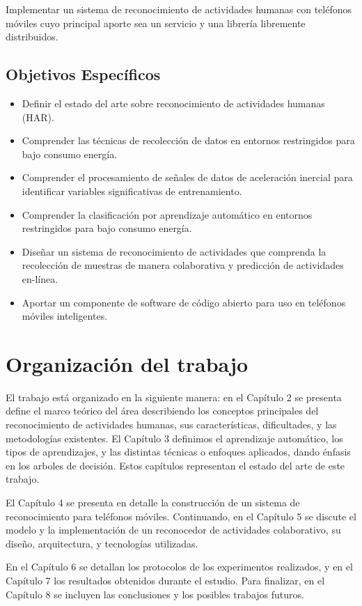 \label{objetivo-general}

Implementar un sistema de reconocimiento de actividades humanas con
teléfonos móviles cuyo principal aporte sea un servicio y una librería
libremente distribuidos.

\subsection{Objetivos Específicos}

\label{objetivos-especuxedficos}
\begin{itemize}
\item Definir el estado del arte sobre reconocimiento de actividades humanas
(HAR). 
\item Comprender las técnicas de recolección de datos en entornos restringidos
para bajo consumo energía. 
\item Comprender el procesamiento de señales de datos de aceleración inercial
para identificar variables significativas de entrenamiento. 
\item Comprender la clasificación por aprendizaje automático en entornos
restringidos para bajo consumo energía. 
\item Diseñar un sistema de reconocimiento de actividades que comprenda
la recolección de muestras de manera colaborativa y predicción de
actividades en-línea. 
\item Aportar un componente de software de código abierto para uso en teléfonos
móviles inteligentes. 
\end{itemize}

\section{Organización del trabajo}

\label{organizaciuxf3n-del-trabajo}

El trabajo está organizado en la siguiente manera: en el Capítulo
2 se presenta define el marco teórico del área describiendo los conceptos
principales del reconocimiento de actividades humanas, sus características,
dificultades, y las metodologías existentes. El Capítulo 3 definimos
el aprendizaje automático, los tipos de aprendizajes, y las distintas
técnicas o enfoques aplicados, dando énfasis en los arboles de decisión.
Estos capítulos representan el estado del arte de este trabajo.

El Capítulo 4 se presenta en detalle la construcción de un sistema
de reconocimiento para teléfonos móviles. Continuando, en el Capítulo
5 se discute el modelo y la implementación de un reconocedor de actividades
colaborativo, su diseño, arquitectura, y tecnologías utilizadas.

En el Capítulo 6 se detallan los protocolos de los experimentos realizados,
y en el Capítulo 7 los resultados obtenidos durante el estudio. Para
finalizar, en el Capítulo 8 se incluyen las conclusiones y los posibles
trabajos futuros. 
